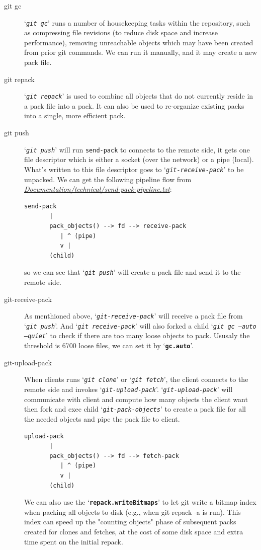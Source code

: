 \documentclass[12pt,oneside]{article}
\newcommand{\code}[1]{\texttt{#1}}
\begin{document}
\begin{description}
  \item[git gc] `\emph{\code{git gc}}' runs a number of housekeeping tasks within the repository,
    such as compressing file revisions (to reduce disk space and increase performance), removing
    unreachable objects which may have been created from prior git commands.
    We can run it manually, and it may create a new pack file.
  \item[git repack] `\emph{\code{git repack}}' is used to combine all objects that do not currently
    reside in a pack file into a pack. It can also be used to re-organize existing packs into
    a single, more efficient pack.
  \item[git push] `\emph{\code{git push}}' will run \code{send-pack} to connects to the remote side,
    it gets one file descriptor which is either a socket (over the network) or a pipe (local).
    What's written to this file descriptor goes to `\emph{\code{git-receive-pack}}' to be unpacked.
    We can get the following pipeline flow from\\
    \emph{\href{https://github.com/git/git/blob/master/Documentation/technical/send-pack-pipeline.txt}{Documentation/technical/send-pack-pipeline.txt}}:
    \begin{lstlisting}[basicstyle=\ttfamily]
    send-pack
       |
       pack_objects() --> fd --> receive-pack
          | ^ (pipe)
          v |
       (child)
    \end{lstlisting}
    so we can see that `\emph{\code{git push}}' will create a pack file and send it to the remote side.
  \item[git-receive-pack] As menthioned above, `\emph{\code{git-receive-pack}}' will receive a pack file
    from `\emph{\code{git push}}'. And `\emph{\code{git receive-pack}}' will also forked a child
    `\emph{\code{git gc --auto --quiet}}' to check if there are too many loose objects to pack.
    Ususaly the threshold is 6700 loose files, we can set it by `\textbf{\code{gc.auto}}'.
  \item[git-upload-pack] When clients runs `\emph{\code{git clone}}' or `\emph{\code{git fetch}}', the
    client connects to the remote side and invokes `\emph{\code{git-upload-pack}}'.
    `\emph{\code{git-upload-pack}}' will communicate with client and compute how many objects the client
    want then fork and exec child `\emph{\code{git-pack-objects}}' to create a pack file for all the
    needed objects and pipe the pack file to client.
    \begin{lstlisting}[basicstyle=\ttfamily]
    upload-pack
       |
       pack_objects() --> fd --> fetch-pack
          | ^ (pipe)
          v |
       (child)
    \end{lstlisting}

    We can also use the `\textbf{\code{repack.writeBitmaps}}' to let git write a bitmap index when packing
    all objects to disk (e.g., when git repack -a is run). This index can speed up the "counting
    objects" phase of subsequent packs created for clones and fetches, at the cost of some disk space
    and extra time spent on the initial repack.

\end{description}
\end{document}
